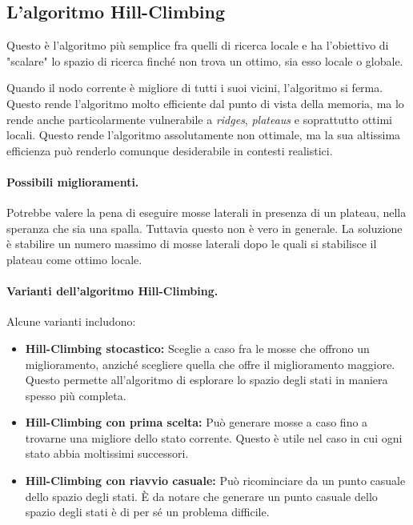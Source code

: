     \subsection{L'algoritmo Hill-Climbing}
        Questo è l'algoritmo più semplice fra quelli di ricerca locale e ha l'obiettivo di "scalare" lo spazio di ricerca finché non trova un ottimo, sia esso locale o globale.
        
        Quando il nodo corrente è migliore di tutti i suoi vicini, l'algoritmo si ferma. Questo rende l'algoritmo molto efficiente dal punto di vista della memoria, ma lo rende anche particolarmente vulnerabile a \textit{ridges}, \textit{plateaus} e soprattutto ottimi locali. Questo rende l'algoritmo assolutamente non ottimale, ma la sua altissima efficienza può renderlo comunque desiderabile in contesti realistici.
        
        \paragraph{Possibili miglioramenti.} Potrebbe valere la pena di eseguire mosse laterali in presenza di un plateau, nella speranza che sia una spalla. Tuttavia questo non è vero in generale. La soluzione è stabilire un numero massimo di mosse laterali dopo le quali si stabilisce il plateau come ottimo locale. 
        
        \paragraph{Varianti dell'algoritmo Hill-Climbing.} Alcune varianti includono:
        \begin{itemize}
            \item \textbf{Hill-Climbing stocastico:} Sceglie a caso fra le mosse che offrono un miglioramento, anziché scegliere quella che offre il miglioramento maggiore. Questo permette all'algoritmo di esplorare lo spazio degli stati in maniera spesso più completa.
            \item \textbf{Hill-Climbing con prima scelta:} Può generare mosse a caso fino a trovarne una migliore dello stato corrente. Questo è utile nel caso in cui ogni stato abbia moltissimi successori.
            \item \textbf{Hill-Climbing con riavvio casuale:} Può ricominciare da un punto casuale dello spazio degli stati. È da notare che generare un punto casuale dello spazio degli stati è di per sé un problema difficile.
        \end{itemize}
            

